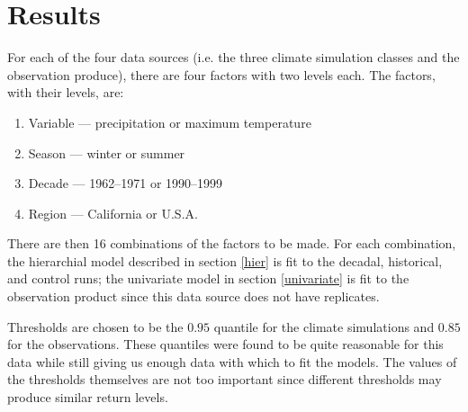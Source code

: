 \section{Results}
\label{results}

For each of the four data sources (i.e. the three climate simulation classes and the observation produce), there are four factors with two levels each. The factors, with their levels, are:
\begin{enumerate}
\item Variable --- precipitation or maximum temperature
\item Season --- winter or summer
\item Decade --- 1962--1971 or 1990--1999
\item Region --- California or U.S.A.
\end{enumerate}
There are then 16 combinations of the factors to be made. For each combination, the hierarchial model described in section \ref{hier} is fit to the decadal, historical, and control runs; the univariate model in section \ref{univariate} is fit to the observation product since this data source does not have replicates.

Thresholds are chosen to be the $0.95$ quantile for the climate simulations and $0.85$ for the observations. These quantiles were found to be quite reasonable for this data while still giving us enough data with which to fit the models. The values of the thresholds themselves are not too important since different thresholds may produce similar return levels.

